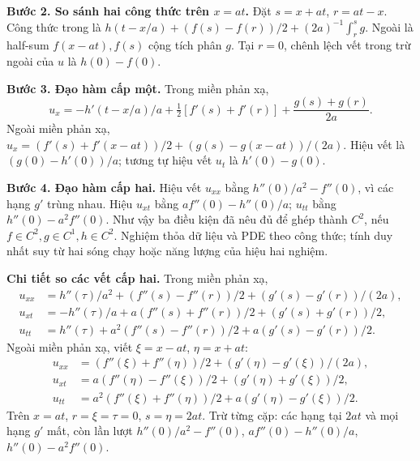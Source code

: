 \documentclass[10pt,a4paper]{article}
\begin{document}
\textbf{Bước 2. So sánh hai công thức trên $x=at$.} Đặt $s=x+at$, $r=at-x$. Công thức trong là $h(t-x/a)+(f(s)-f(r))/2+(2a)^{-1}\int_r^s g$. Ngoài là half-sum $f(x-at),f(s)$ cộng tích phân $g$. Tại $r=0$, chênh lệch vết trong trừ ngoài của $u$ là $h(0)-f(0)$.

\textbf{Bước 3. Đạo hàm cấp một.} Trong miền phản xạ,
\[u_x=-h'(t-x/a)/a+\tfrac12[f'(s)+f'(r)]+\frac{g(s)+g(r)}{2a}.\]
Ngoài miền phản xạ, $u_x=(f'(s)+f'(x-at))/2+(g(s)-g(x-at))/(2a)$. Hiệu vết là $(g(0)-h'(0))/a$; tương tự hiệu vết $u_t$ là $h'(0)-g(0)$.

\textbf{Bước 4. Đạo hàm cấp hai.} Hiệu vết $u_{xx}$ bằng $h''(0)/a^2-f''(0)$, vì các hạng $g'$ trùng nhau. Hiệu $u_{xt}$ bằng $af''(0)-h''(0)/a$; $u_{tt}$ bằng $h''(0)-a^2f''(0)$. Như vậy ba điều kiện đã nêu đủ để ghép thành $C^2$, nếu $f\in C^2,g\in C^1,h\in C^2$. Nghiệm thỏa dữ liệu và PDE theo công thức; tính duy nhất suy từ hai sóng chạy hoặc năng lượng của hiệu hai nghiệm.

\textbf{Chi tiết so các vết cấp hai.} Trong miền phản xạ,
\[\begin{aligned}
u_{xx}&=h''(\tau)/a^2+(f''(s)-f''(r))/2+(g'(s)-g'(r))/(2a),\\
u_{xt}&=-h''(\tau)/a+a(f''(s)+f''(r))/2+(g'(s)+g'(r))/2,\\
u_{tt}&=h''(\tau)+a^2(f''(s)-f''(r))/2+a(g'(s)-g'(r))/2.
\end{aligned}\]
Ngoài miền phản xạ, viết $\xi=x-at$, $\eta=x+at$:
\[\begin{aligned}
u_{xx}&=(f''(\xi)+f''(\eta))/2+(g'(\eta)-g'(\xi))/(2a),\\
u_{xt}&=a(f''(\eta)-f''(\xi))/2+(g'(\eta)+g'(\xi))/2,\\
u_{tt}&=a^2(f''(\xi)+f''(\eta))/2+a(g'(\eta)-g'(\xi))/2.
\end{aligned}\]
Trên $x=at$, $r=\xi=\tau=0$, $s=\eta=2at$. Trừ từng cặp: các hạng tại $2at$ và mọi hạng $g'$ mất, còn lần lượt $h''(0)/a^2-f''(0)$, $af''(0)-h''(0)/a$, $h''(0)-a^2f''(0)$.
\end{document}
